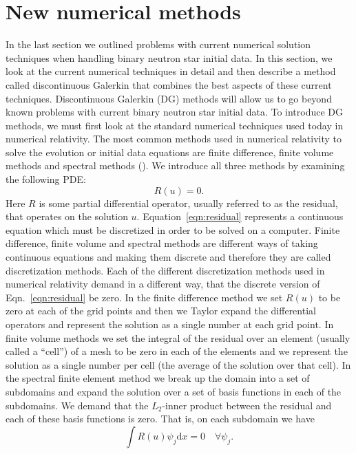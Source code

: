 \section{New numerical methods}

In the last section we outlined problems with current numerical solution techniques when handling binary neutron star initial data. In this section, we look at the current numerical techniques in detail and then describe a method called discontinuous Galerkin that combines the best aspects of these current techniques. Discontinuous Galerkin (DG) methods will allow us to go beyond known problems with current binary neutron star initial data.
To introduce DG methods, we must first look at the standard numerical techniques used today in numerical relativity. The most common methods used in numerical relativity to solve the evolution or initial data equations are finite difference, finite volume methods and spectral methods (\citet*{baumgarte2010numerical}). We introduce all three methods by examining the following PDE:
%
\begin{equation}
  \label{eqn:residual}
 R(u) = 0.
\end{equation}
%
Here $R$ is some partial differential operator, usually referred to as the residual, that operates on the solution $u$. Equation~\ref{eqn:residual} represents a continuous equation which must be discretized in order to be solved on a computer. Finite difference, finite volume and spectral methods are different ways of taking continuous equations and making them discrete and therefore they are called discretization methods. Each of the different discretization methods used in numerical relativity demand in a different way, that the discrete version of Eqn.~\ref{eqn:residual} be zero. In the finite difference method we set $R(u)$ to be zero at each of the grid points and then we Taylor expand the differential operators and represent the solution as a single number at each grid point. In finite volume methods we set the integral of the residual over an element (usually called a ``cell'') of a mesh to be zero in each of the elements and we represent the solution as a single number per cell (the average of the solution over that cell). In the spectral finite element method we break up the domain into a set of subdomains and expand the solution over a set of basis functions in each of the subdomains. We demand that the $L_2$-inner product between the residual and each of these basis functions is zero. That is, on each subdomain we have
%
\begin{equation}
  \label{eqn:l2orthog}
 \int R(u)\psi_j  \mathrm{d}x = 0 \quad \forall \psi_j.
\end{equation}
%

